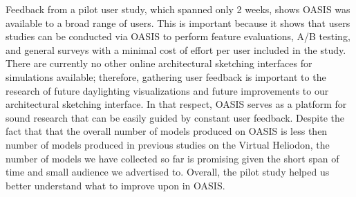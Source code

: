 







Feedback from a pilot user study, which spanned only 2 weeks, shows OASIS was available to a broad range of users.
This is important because it shows that users studies can be conducted via OASIS to perform feature evaluations, A/B testing, and general surveys with a minimal cost of effort per user included in the study.  
There are currently no other online architectural sketching interfaces for simulations available; therefore,  gathering user feedback is important to the research of future daylighting visualizations and future improvements to our architectural sketching interface. 
In that respect, OASIS serves as a platform for sound research that can be easily guided by constant user feedback. 
Despite the fact that that the overall number of models produced on OASIS is less then number of models produced in previous studies on the Virtual Heliodon, the number of models we have collected so far is promising given the short span of time and small  audience we advertised to. 
Overall, the pilot study helped us better understand what to improve upon in OASIS.




